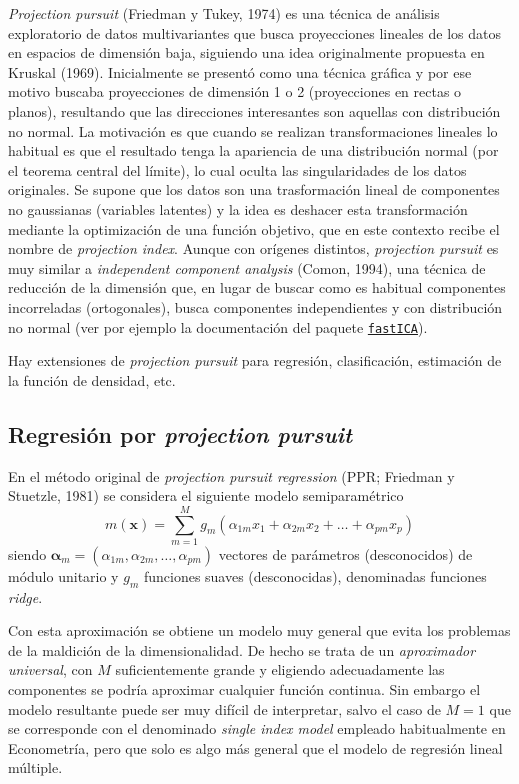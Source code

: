 \documentclass[
]{book}
\theoremstyle{break}
\theoremstyle{definition}
\theoremstyle{definition}
\theoremstyle{definition}
\theoremstyle{definition}
\theoremstyle{remark}
\begin{document}
\emph{Projection pursuit} (Friedman y Tukey, 1974) es una técnica de análisis exploratorio de datos multivariantes que busca proyecciones lineales de los datos en espacios de dimensión baja, siguiendo una idea originalmente propuesta en Kruskal (1969).
Inicialmente se presentó como una técnica gráfica y por ese motivo buscaba proyecciones de dimensión 1 o 2 (proyecciones en rectas o planos), resultando que las direcciones interesantes son aquellas con distribución no normal.
La motivación es que cuando se realizan transformaciones lineales lo habitual es que el resultado tenga la apariencia de una distribución normal (por el teorema central del límite), lo cual oculta las singularidades de los datos originales.
Se supone que los datos son una trasformación lineal de componentes no gaussianas (variables latentes) y la idea es deshacer esta transformación mediante la optimización de una función objetivo, que en este contexto recibe el nombre de \emph{projection index}.
Aunque con orígenes distintos, \emph{projection pursuit} es muy similar a \emph{independent component analysis} (Comon, 1994), una técnica de reducción de la dimensión que, en lugar de buscar como es habitual componentes incorreladas (ortogonales), busca componentes independientes y con distribución no normal (ver por ejemplo la documentación del paquete \href{https://CRAN.R-project.org/package=fastICA}{\texttt{fastICA}}).

Hay extensiones de \emph{projection pursuit} para regresión, clasificación, estimación de la función de densidad, etc.

\hypertarget{ppr}{%
\subsection{\texorpdfstring{Regresión por \emph{projection pursuit}}{Regresión por projection pursuit}}\label{ppr}}

En el método original de \emph{projection pursuit regression} (PPR; Friedman y Stuetzle, 1981) se considera el siguiente modelo semiparamétrico
\[m(\mathbf{x}) = \sum_{m=1}^M g_m (\alpha_{1m}x_1 + \alpha_{2m}x_2 + \ldots + \alpha_{pm}x_p)\]
siendo \(\boldsymbol{\alpha}_m = (\alpha_{1m}, \alpha_{2m}, \ldots, \alpha_{pm})\) vectores de parámetros (desconocidos) de módulo unitario y \(g_m\) funciones suaves (desconocidas), denominadas funciones \emph{ridge}.

Con esta aproximación se obtiene un modelo muy general que evita los problemas de la maldición de la dimensionalidad.
De hecho se trata de un \emph{aproximador universal}, con \(M\) suficientemente grande y eligiendo adecuadamente las componentes se podría aproximar cualquier función continua.
Sin embargo el modelo resultante puede ser muy difícil de interpretar, salvo el caso de \(M=1\) que se corresponde con el denominado \emph{single index model} empleado habitualmente en Econometría, pero que solo es algo más general que el modelo de regresión lineal múltiple.
\end{document}
